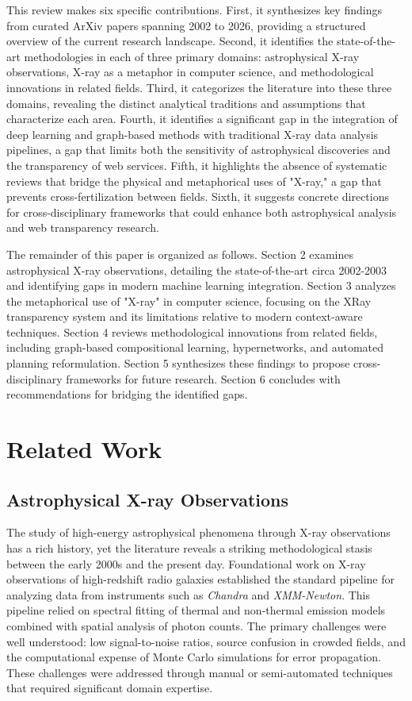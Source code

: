 \documentclass[conference]{IEEEtran}
\begin{document}
This review makes six specific contributions. First, it synthesizes key findings from curated ArXiv papers spanning 2002 to 2026, providing a structured overview of the current research landscape. Second, it identifies the state-of-the-art methodologies in each of three primary domains: astrophysical X-ray observations, X-ray as a metaphor in computer science, and methodological innovations in related fields. Third, it categorizes the literature into these three domains, revealing the distinct analytical traditions and assumptions that characterize each area. Fourth, it identifies a significant gap in the integration of deep learning and graph-based methods with traditional X-ray data analysis pipelines, a gap that limits both the sensitivity of astrophysical discoveries and the transparency of web services. Fifth, it highlights the absence of systematic reviews that bridge the physical and metaphorical uses of "X-ray," a gap that prevents cross-fertilization between fields. Sixth, it suggests concrete directions for cross-disciplinary frameworks that could enhance both astrophysical analysis and web transparency research.

The remainder of this paper is organized as follows. Section 2 examines astrophysical X-ray observations, detailing the state-of-the-art circa 2002-2003 and identifying gaps in modern machine learning integration. Section 3 analyzes the metaphorical use of "X-ray" in computer science, focusing on the XRay transparency system and its limitations relative to modern context-aware techniques. Section 4 reviews methodological innovations from related fields, including graph-based compositional learning, hypernetworks, and automated planning reformulation. Section 5 synthesizes these findings to propose cross-disciplinary frameworks for future research. Section 6 concludes with recommendations for bridging the identified gaps.

\section{Related Work}

\subsection{Astrophysical X-ray Observations}

The study of high-energy astrophysical phenomena through X-ray observations has a rich history, yet the literature reveals a striking methodological stasis between the early 2000s and the present day. Foundational work on X-ray observations of high-redshift radio galaxies \cite{r1} established the standard pipeline for analyzing data from instruments such as \textit{Chandra} and \textit{XMM-Newton}. This pipeline relied on spectral fitting of thermal and non-thermal emission models combined with spatial analysis of photon counts. The primary challenges were well understood: low signal-to-noise ratios, source confusion in crowded fields, and the computational expense of Monte Carlo simulations for error propagation. These challenges were addressed through manual or semi-automated techniques that required significant domain expertise.
\end{document}

